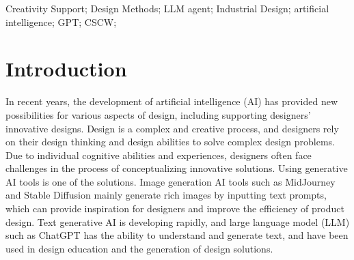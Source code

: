 \documentclass[10pt, conference, compsocconf]{IEEEtran}
\begin{document}




\maketitle


\begin{abstract}
Generative AI faces many challenges when entering the product design workflow, such as interface usability and interaction patterns. Therefore, based on design thinking and design process, we developed the DesignGPT multi-agent collaboration framework, which uses artificial intelligence agents to simulate the roles of different positions in the design company and allows human designers to collaborate with them in natural language. Experimental results show that compared with separate AI tools, DesignGPT improves the performance of designers, highlighting the potential of applying multi-agent systems that integrate design domain knowledge to product scheme design.

\end{abstract}

\begin{IEEEkeywords}
Creativity Support; Design Methods; LLM agent; Industrial Design; artificial intelligence; GPT; CSCW;

\end{IEEEkeywords}


%
\IEEEpeerreviewmaketitle



\section{Introduction}
In recent years, the development of artificial intelligence (AI) has provided new possibilities for various aspects of design, including supporting designers' innovative designs\cite{tang2019review}. Design is a complex and creative process, and designers rely on their design thinking and design abilities to solve complex design problems. Due to individual cognitive abilities and experiences, designers often face challenges in the process of conceptualizing innovative solutions. Using generative AI tools is one of the solutions. Image generation AI tools such as MidJourney\cite{2edu} and Stable Diffusion\cite{1SD} mainly generate rich images by inputting text prompts, which can provide inspiration for designers and improve the efficiency of product design. Text generative AI is developing rapidly, and large language model (LLM) such as ChatGPT\cite{ray2023chatgpt} has the ability to understand and generate text, and have been used in design education\cite{2edu} \cite{fangrole} and the generation of design solutions. 
\end{document}
